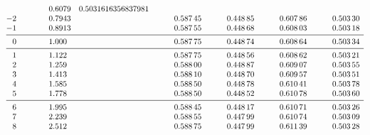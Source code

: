 \documentclass[11pt]{report}
\begin{document}
\begin{table}[]
\[\begin{array}{@{}SS[round-mode=figures,round-precision=4]l*4{S[round-mode=figures,round-precision=5,group-separator={\,}]}}
                & 0.6078782887164116
                & 0.5031616356837981
        \\*
            -2 & 0.7943282347242815
                && 0.58745
                & 0.44885028804432964
                & 0.6078626211036924
                & 0.5032986730138832
        \\*
            -1 & 0.8912509381337456
                && 0.58755
                & 0.4486755319067122
                & 0.60803368099758
                & 0.5031846728113596
        \\*
        \midrule
            0 & 1.0
                && 0.58775
                & 0.44873970852075407
                & 0.6086427593859304
                & 0.5033432141352383
        \\*
        \midrule
            1 & 1.1220184543019633
                && 0.58775
                & 0.4485649523831367
                & 0.6086225636833118
                & 0.5032103547844932
        \\*
            2 & 1.2589254117941673
                && 0.588
                & 0.448872024309299
                & 0.6090748139440184
                & 0.5035466488795411
        \\*
            3 & 1.4125375446227544
                && 0.5881
                & 0.44869726817168165
                & 0.6095694906461742
                & 0.5035110328600362
        \\*
            4 & 1.5848931924611136
                && 0.5885
                & 0.4487782332757218
                & 0.6104109099997941
                & 0.5037766968830625
        \\*
            5 & 1.7782794100389228
                && 0.5885
                & 0.44852251203406435
                & 0.6107817976750681
                & 0.5036020810947259
        \\*
        \midrule
            6 & 1.9952623149688795
                && 0.58845
                & 0.44817299975882957
                & 0.6107110409285051
                & 0.5032615372821362
        \\*
            7 & 2.2387211385683394
                && 0.58855
                & 0.44798541769167527
                & 0.6107363934997151
                & 0.5030861896774851
        \\*
            8 & 2.51188643150958
                && 0.58875
                & 0.44798541769167527
                & 0.6113871721572975
                & 0.5032827113710475
        \\*

\end{array}\]
\end{table}
\end{document}
